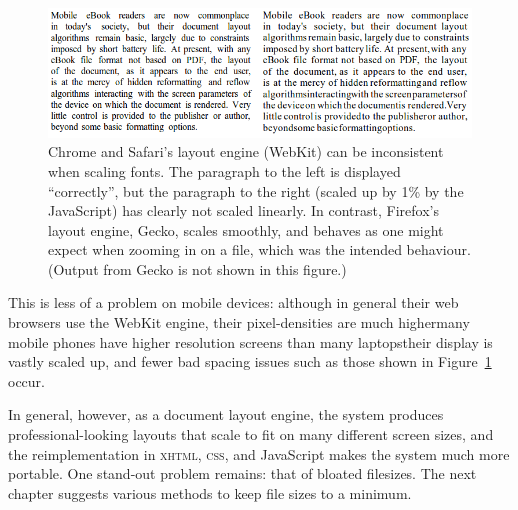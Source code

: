 \begin{figure}
    \includegraphics[width=\textwidth]{gfx/webkitisshit}
    \caption[Inconsistent font scaling by WebKit]{Chrome and Safari's layout engine (WebKit) can be inconsistent when scaling fonts. The paragraph to the left is displayed ``correctly'', but the paragraph to the right (scaled up by 1\% by the JavaScript) has clearly not scaled linearly. In contrast, Firefox's layout engine, Gecko, scales smoothly, and behaves as one might expect when zooming in on a \pdf{} file, which was the intended behaviour. (Output from Gecko is not shown in this figure.)}
    \label{fig:craprenderer}
\end{figure}

This is less of a problem on mobile devices: although in general their web browsers use the WebKit engine, their pixel-densities are much higher\ed many mobile phones have higher resolution screens than many laptops\ed their display is vastly scaled up, and fewer bad spacing issues such as those shown in Figure~\ref{fig:craprenderer} occur.

In general, however, as a document layout engine, the system produces professional-looking layouts that scale to fit on many different screen sizes, and the reimplementation in \textsc{xhtml}, \textsc{css}, and JavaScript makes the system much more portable. One stand-out problem remains: that of bloated filesizes. The next chapter suggests various methods to keep file sizes to a minimum.





